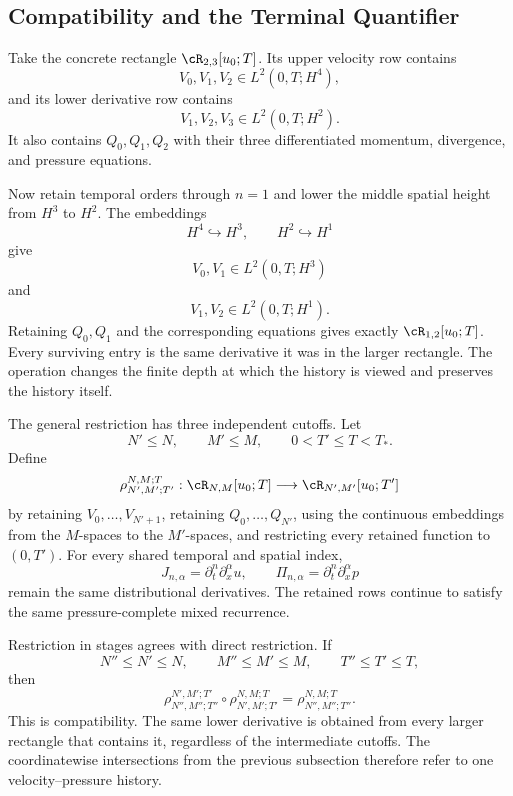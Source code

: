 
\subsection{Compatibility and the Terminal Quantifier}\label{sub:CompatibilityAndTheTerminalQuantifier}

Take the concrete rectangle \(\cR_{2,3}[u_0;T]\).
Its upper velocity row contains
\[
  V_0,V_1,V_2
  \in
  L^2(0,T;H^4),
\]
and its lower derivative row contains
\[
  V_1,V_2,V_3
  \in
  L^2(0,T;H^2).
\]
It also contains \(Q_0,Q_1,Q_2\) with their three differentiated momentum, divergence, and pressure equations.

Now retain temporal orders through \(n=1\) and lower the middle spatial height from \(H^3\) to \(H^2\).
The embeddings
\[
  H^4\hookrightarrow H^3,
  \qquad
  H^2\hookrightarrow H^1
\]
give
\[
  V_0,V_1
  \in
  L^2(0,T;H^3)
\]
and
\[
  V_1,V_2
  \in
  L^2(0,T;H^1).
\]
Retaining \(Q_0,Q_1\) and the corresponding equations gives exactly \(\cR_{1,2}[u_0;T]\).
Every surviving entry is the same derivative it was in the larger rectangle.
The operation changes the finite depth at which the history is viewed and preserves the history itself.

The general restriction has three independent cutoffs.
Let
\[
  N'\leq N,
  \qquad
  M'\leq M,
  \qquad
  0<T'\leq T<T_*.
\]
Define
\[
  \rho_{N',M';T'}^{N,M;T}:
  \cR_{N,M}[u_0;T]
  \longrightarrow
  \cR_{N',M'}[u_0;T']
\]
by retaining \(V_0,\ldots,V_{N'+1}\), retaining \(Q_0,\ldots,Q_{N'}\), using the continuous embeddings from the \(M\)-spaces to the \(M'\)-spaces, and restricting every retained function to \((0,T')\).
For every shared temporal and spatial index,
\[
  J_{n,\alpha}
  =
  \partial_t^n\partial_x^\alpha u,
  \qquad
  \Pi_{n,\alpha}
  =
  \partial_t^n\partial_x^\alpha p
\]
remain the same distributional derivatives.
The retained rows continue to satisfy the same pressure-complete mixed recurrence.

Restriction in stages agrees with direct restriction.
If
\[
  N''\leq N'\leq N,
  \qquad
  M''\leq M'\leq M,
  \qquad
  T''\leq T'\leq T,
\]
then
\[
  \rho_{N'',M'';T''}^{N',M';T'}
  \circ
  \rho_{N',M';T'}^{N,M;T}
  =
  \rho_{N'',M'';T''}^{N,M;T}.
\]
This is compatibility.
The same lower derivative is obtained from every larger rectangle that contains it, regardless of the intermediate cutoffs.
The coordinatewise intersections from the previous subsection therefore refer to one velocity--pressure history.

